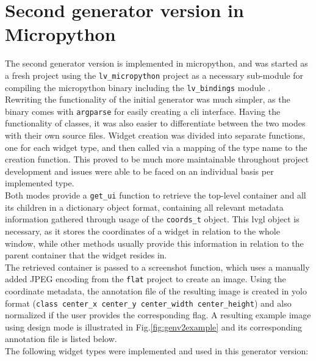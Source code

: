 \documentclass[Bachelor, BIC, english, fhCitStyle, IEEE]{BASE/twbook} %
\def\code#1{\texttt{#1}}
\begin{document}
\section{Second generator version in Micropython}
The second generator version is implemented in micropython, and was started as a fresh project using the \code{lv\_micropython} project \autocite{LvglLv_binding_micropythonLVGL} as a necessary sub-module for compiling the micropython binary including the \code{lv\_bindings} module \autocite{LvglLv_micropythonMicropython}.\\
Rewriting the functionality of the initial generator was much simpler, as the binary comes with \code{argparse} for easily creating a \ac{cli} interface. Having the functionality of classes, it was also easier to differentiate between the two modes with their own source files. Widget creation was divided into separate functions, one for each widget type, and then called via a mapping of the type name to the creation function. This proved to be much more maintainable throughout project development and issues were able to be faced on an individual basis per implemented type.\\
Both modes provide a \code{get\_ui} function to retrieve the top-level container and all its children in a dictionary object format, containing all relevant metadata information gathered through usage of the \code{coords\_t} object. This \ac{lvgl} object is necessary, as it stores the coordinates of a widget in relation to the whole window, while other methods usually provide this information in relation to the parent container that the widget resides in.\\
The retrieved container is passed to a screenshot function, which uses a manually added JPEG encoding from the \code{flat} project \autocite{FlatFlatJpeg} to create an image. Using the coordinate metadata, the annotation file of the resulting image is created in \ac{yolo} format (\code{class center\_x center\_y center\_width center\_height}) and also normalized if the user provides the corresponding flag.
A resulting example image using design mode is illustrated in Fig.\ref{fig:genv2example} and its corresponding annotation file is listed below.\\
The following widget types were implemented and used in this generator version:
\end{document}
